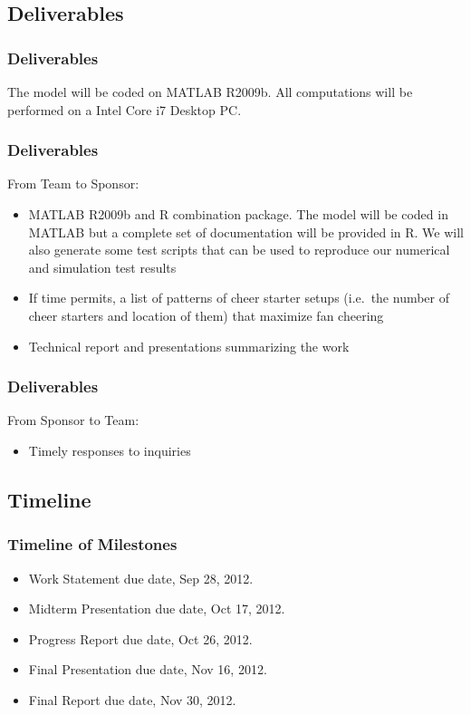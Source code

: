 \documentclass[compress,handout,10pt]{beamer}
\let\olditem\item
\renewcommand{\item}{\setlength{\itemsep}{0.5\baselineskip}\olditem}
\begin{document}
\subsection{Deliverables}

\begin{frame}
	\frametitle{Deliverables}
	The model will be coded on MATLAB R2009b. All computations will be performed on a Intel Core i7 Desktop PC. \newline
	\end{frame}

\begin{frame}
	\frametitle{Deliverables}
	From Team to Sponsor:
	\begin {itemize}
	\item MATLAB R2009b and R combination package. The model will be coded in MATLAB but a complete set of documentation will be provided in R. We will also generate some test scripts that can be used to reproduce our numerical and simulation test results
	\item If time permits, a list of patterns of cheer starter setups (i.e.~the number of cheer starters and location of them) that maximize fan cheering
	\item Technical report and presentations summarizing the work \newline
	\end{itemize}
\end{frame}

\begin{frame}
	\frametitle{Deliverables}
	From Sponsor to Team:
	\begin{itemize}
		\item Timely responses to inquiries
	\end{itemize}
\end{frame}

\subsection{Timeline}

\begin{frame}
	\frametitle{Timeline of Milestones}
	\begin{itemize}
    \item Work Statement due date, Sep 28, 2012.
    \item Midterm Presentation due date, Oct 17, 2012.
    \item Progress Report due date, Oct 26, 2012.
    \item Final Presentation due date, Nov 16, 2012.
    \item Final Report due date, Nov 30, 2012.
	\end{itemize}
\end{frame}
\end{document}
